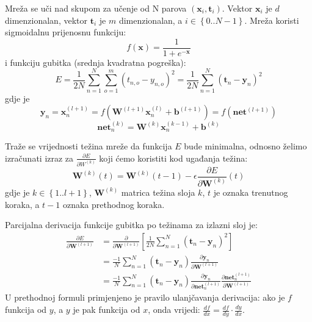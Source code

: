 \documentclass[times, utf8, diplomski, numeric]{fer}
\begin{document}
Mreža se uči nad skupom za učenje od N parova $(\boldsymbol{x}_i, \boldsymbol{t}_i)$. Vektor $\boldsymbol{x}_i$ je $d$ dimenzionalan, vektor $\boldsymbol{t}_i$ je $m$ dimenzionalan, a $i \in \left\{ 0..N-1 \right\}$. Mreža koristi sigmoidalnu prijenosnu funkciju:
\begin{equation}
  f(\boldsymbol{x}) = \frac{1}{1 + e^{-\boldsymbol{x}}}
\end{equation}
i funkciju gubitka (srednja kvadratna pogreška):
\begin{equation}
  E = \frac{1}{2N} \sum_{n=1}^{N} \sum_{o=1}^{m} \left( t_{n,o} - y_{n,o} \right)^2
    = \frac{1}{2N} \sum_{n=1}^{N} \left( \boldsymbol{t}_{n} - \boldsymbol{y}_{n} \right)^2
\end{equation}
gdje je
\begin{equation} %
	\boldsymbol{y}_n = \boldsymbol{x}_n^{(l+1)} = f(\boldsymbol{W}^{(l+1)} \boldsymbol{x}_n^{(l)} + \boldsymbol{b}^{(l+1)}) = f(\boldsymbol{net}^{(l+1)})
\end{equation}
\begin{equation} %
    \boldsymbol{net}^{(k)}_n = \boldsymbol{W}^{(k)} \boldsymbol{x}_n^{(k-1)} + \boldsymbol{b}^{(k)}
\end{equation}

Traže se vrijednosti težina mreže da funkcija $E$ bude minimalna, odnosno želimo izračunati izraz za $\frac{\partial E}{\partial W^{(k)}}$ koji ćemo koristiti kod ugađanja težina:
\begin{equation}
\boldsymbol{W}^{(k)}(t) = \boldsymbol{W}^{(k)}(t-1) - \epsilon \frac{\partial E}{\partial \boldsymbol{W}^{(k)}}(t)
\end{equation}
gdje je $k \in \left\{ 1..l+1 \right\}$, $\boldsymbol{W}^{(k)}$ matrica težina sloja $k$, $t$ je oznaka trenutnog koraka, a $t-1$ oznaka prethodnog koraka.

Parcijalna derivacija funkcije gubitka po težinama za izlazni sloj je:
\begin{equation} %
\begin{split}
  \frac{\partial E}{\partial \boldsymbol{W}^{(l+1)}}
    &= \frac{\partial}{\partial \boldsymbol{W}^{(l+1)}} \left[ \frac{1}{2N} \sum_{n=1}^{N} \left( \boldsymbol{t}_{n} - \boldsymbol{y}_{n} \right)^2 \right] \\
    &= \frac{-1}{N} \sum_{n=1}^{N} \left( \boldsymbol{t}_{n} - \boldsymbol{y}_{n} \right) \frac{\partial \boldsymbol{y}_n}{\partial \boldsymbol{W}^{(l+1)}} \\
    &= \frac{-1}{N} \sum_{n=1}^{N} \left( \boldsymbol{t}_{n} - \boldsymbol{y}_{n} \right) \frac{\partial \boldsymbol{y}_n}{\partial \boldsymbol{net}_n^{(l+1)}} \frac{\partial \boldsymbol{net}_n^{(l+1)}}{\partial \boldsymbol{W}^{(l+1)}}
\end{split}
\end{equation}
U prethodnoj formuli primjenjeno je pravilo ulanjčavanja derivacija: ako je $f$ funkcija od $y$, a $y$ je pak funkcija od $x$, onda vrijedi: $\frac{d f}{d x} = \frac{d f}{d y} \cdot \frac{d y}{d x}$.
\end{document}
